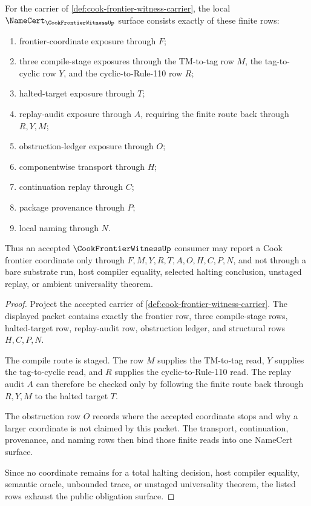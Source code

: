 \begin{theorem}
\label{thm:cook-frontier-witness-obligation-surface}
For the carrier of \autoref{def:cook-frontier-witness-carrier}, the local $\NameCert_{\CookFrontierWitnessUp}$ surface consists exactly of these finite rows:
\begin{enumerate}
\item frontier-coordinate exposure through $F$;
\item three compile-stage exposures through the TM-to-tag row $M$, the tag-to-cyclic row $Y$, and the cyclic-to-Rule-110 row $R$;
\item halted-target exposure through $T$;
\item replay-audit exposure through $A$, requiring the finite route back through $R,Y,M$;
\item obstruction-ledger exposure through $O$;
\item componentwise transport through $H$;
\item continuation replay through $C$;
\item package provenance through $P$;
\item local naming through $N$.
\end{enumerate}
Thus an accepted $\CookFrontierWitnessUp$ consumer may report a Cook frontier coordinate only through $F,M,Y,R,T,A,O,H,C,P,N$, and not through a bare substrate run, host compiler equality, selected halting conclusion, unstaged replay, or ambient universality theorem.
\end{theorem}
\begin{proof}
Project the accepted carrier of \autoref{def:cook-frontier-witness-carrier}. The displayed packet contains exactly the frontier row, three compile-stage rows, halted-target row, replay-audit row, obstruction ledger, and structural rows $H,C,P,N$.

The compile route is staged. The row $M$ supplies the TM-to-tag read, $Y$ supplies the tag-to-cyclic read, and $R$ supplies the cyclic-to-Rule-110 read. The replay audit $A$ can therefore be checked only by following the finite route back through $R,Y,M$ to the halted target $T$.

The obstruction row $O$ records where the accepted coordinate stops and why a larger coordinate is not claimed by this packet. The transport, continuation, provenance, and naming rows then bind those finite reads into one NameCert surface.

Since no coordinate remains for a total halting decision, host compiler equality, semantic oracle, unbounded trace, or unstaged universality theorem, the listed rows exhaust the public obligation surface.
\end{proof}

